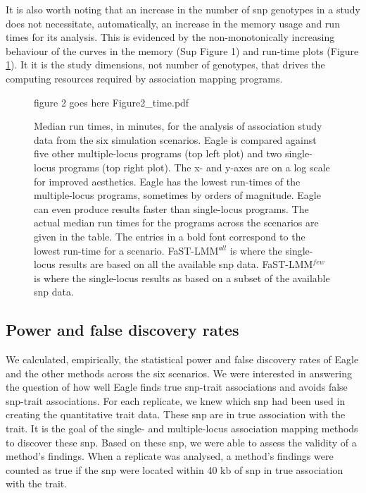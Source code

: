 \documentclass{nature}
\begin{document}
  
 It is also worth noting that an increase in the number of snp genotypes in a study does not necessitate, automatically,  
 an increase in the memory usage and run times for its analysis. This is  evidenced by the non-monotonically 
 increasing behaviour of the curves in the memory (Sup Figure 1) and run-time plots (Figure \ref{fig_time}).  It 
it is the study dimensions, not number of genotypes, that drives the computing resources required by 
association mapping programs.   
 
  
\begin{figure}
\caption{Median run times, in minutes, for the analysis of association study data from the six simulation scenarios. 
Eagle is compared against five other multiple-locus programs (top left plot) and two single-locus programs (top right plot). 
The x- and y-axes are on a log scale for improved aesthetics. Eagle has the lowest run-times of the multiple-locus 
programs, sometimes by orders of magnitude. Eagle can even produce results faster than single-locus programs. 
The actual median run times for the programs across the scenarios are given in the table. The entries in a bold font 
correspond to the lowest run-time for a scenario. 
 FaST-LMM$^{all}$ is where the single-locus results are based on all the available 
snp data. FaST-LMM$^{few}$ is where the single-locus results as based on a subset of the available snp data. }

\label{fig_time}
figure 2 goes here {Figure2_time.pdf}

\end{figure}




\subsection{Power and false discovery rates}

We calculated, empirically, the statistical power and false discovery rates of Eagle and the other methods across the six scenarios. 
We were interested in answering the question of how well Eagle finds true snp-trait associations and avoids false snp-trait associations. 
For each replicate, we knew which snp had been used in creating the quantitative trait data. These snp are in true association with 
the trait. It is the goal of the single- and multiple-locus association mapping methods to discover these snp. 
 Based on these snp, we were able to assess the validity of a  method's findings. When a replicate was analysed, 
 a method's findings were counted as true if the snp were located within 40 kb of snp in true 
association with the trait. 
\end{document}

